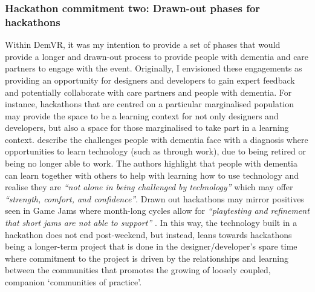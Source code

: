 \subsubsection{Hackathon commitment two: Drawn-out phases for hackathons}
\label{DiscussionThree:CommitTwo}
Within DemVR, it was my intention to provide a set of phases that would provide a longer and drawn-out process to provide people with dementia and care partners to engage with the event. Originally, I envisioned these engagements as providing an opportunity for designers and developers to gain expert feedback and potentially collaborate with care partners and people with dementia. For instance, hackathons that are centred on a particular marginalised population may provide the space to be a learning context for not only designers and developers, but also a space for those marginalised to take part in a learning context. \cite{rosenberg2012persons} describe the challenges people with dementia face with a diagnosis where opportunities to learn technology (such as through work), due to being retired or being no longer able to work. The authors highlight that people with dementia can learn together with others to help with learning how to use technology and realise they are \textit{``not alone in being challenged by technology''} which may offer \textit{``strength, comfort, and confidence''}. Drawn out hackathons may mirror positives seen in Game Jams where month-long cycles allow for \textit{``playtesting and refinement that short jams are not able to support''} \citep{faas2019jam}. In this way, the technology built in a hackathon does not end post-weekend, but instead, leans towards hackathons being a longer-term project that is done in the designer/developer’s spare time where commitment to the project is driven by the relationships and learning between the communities that promotes the growing of loosely coupled, companion `communities of practice'.

